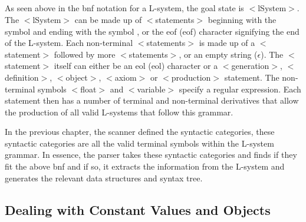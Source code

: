 \begin{singlespace}
\begin{bnf*}
		{\bnfts{*}}\\
		\\
		\\
		{}\\
		{}\\
		{\bnfts{==} \bnfor \bnfts{!=} \bnfor \bnfts{$<=$} \bnfor \bnfts{$>=$} \bnfor \bnfts{$>$} \bnfor \bnfts{$<$}}\\
		{}\\
		{\bnfes \bnfor {} }\\
		{}\\
	\end{bnf*}

\newpage

\end{singlespace} 

\noindent
As seen above in the \acrshort{bnf} notation for a L-system, the goal state is $<$lSystem$>$. The $<$lSystem$>$ can be made up of $<$statements$>$ beginning with the symbol \say{\#} and ending with the symbol \say{;}, or the \acrlong{eof} (\acrshort{eof}) character signifying the end of the L-system. Each non-terminal $<$statements$>$ is made up of a $<$statement$>$ followed by more $<$statements$>$, or an empty string ($\epsilon$). The $<$statement$>$ itself can either be an \acrlong{eol} (\acrshort{eol}) character or a $<$generation$>$, $<$definition$>$, $<$object$>$, $<$axiom$>$ or $<$production$>$ statement. The non-terminal symbols $<$float$>$ and $<$variable$>$ specify a regular expression. Each statement then has a number of terminal and non-terminal derivatives that allow the production of all valid L-systems that follow this grammar. 

In the previous chapter, the scanner defined the syntactic categories, these syntactic categories are all the valid terminal symbols within the L-system grammar. In essence, the parser takes these syntactic categories and finds if they fit the above \acrshort{bnf} and if so, it extracts the information from the L-system and generates the relevant data structures and syntax tree. 

\subsection{Dealing with Constant Values and Objects}

